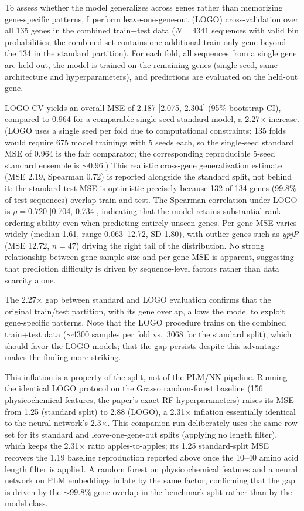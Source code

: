 \documentclass[12pt]{article}
\begin{document}
To assess whether the model generalizes across genes rather than memorizing gene-specific patterns, I perform leave-one-gene-out (LOGO) cross-validation over all 135 genes in the combined train+test data ($N = 4341$ sequences with valid bin probabilities; the combined set contains one additional train-only gene beyond the 134 in the standard partition).
For each fold, all sequences from a single gene are held out, the model is trained on the remaining genes (single seed, same architecture and hyperparameters), and predictions are evaluated on the held-out gene.

LOGO CV yields an overall MSE of 2.187 [2.075, 2.304] (95\% bootstrap CI), compared to 0.964 for a comparable single-seed standard model, a 2.27$\times$ increase.
(LOGO uses a single seed per fold due to computational constraints: 135 folds would require 675 model trainings with 5 seeds each, so the single-seed standard MSE of 0.964 is the fair comparator; the corresponding reproducible 5-seed standard ensemble is ${\sim}0.96$.)
This realistic cross-gene generalization estimate (MSE 2.19, Spearman 0.72) is reported alongside the standard split, not behind it: the standard test MSE is optimistic precisely because 132 of 134 genes (99.8\% of test sequences) overlap train and test.
The Spearman correlation under LOGO is $\rho = 0.720$ [0.704, 0.734], indicating that the model retains substantial rank-ordering ability even when predicting entirely unseen genes.
Per-gene MSE varies widely (median 1.61, range 0.063--12.72, SD 1.80), with outlier genes such as \textit{ypjP} (MSE 12.72, $n = 47$) driving the right tail of the distribution.
No strong relationship between gene sample size and per-gene MSE is apparent, suggesting that prediction difficulty is driven by sequence-level factors rather than data scarcity alone.

The 2.27$\times$ gap between standard and LOGO evaluation confirms that the original train/test partition, with its gene overlap, allows the model to exploit gene-specific patterns.
Note that the LOGO procedure trains on the combined train+test data (${\sim}$4300 samples per fold vs.\ 3068 for the standard split), which should favor the LOGO models; that the gap persists despite this advantage makes the finding more striking.

This inflation is a property of the split, not of the PLM/NN pipeline. Running the identical LOGO protocol on the Grasso random-forest baseline (156 physicochemical features, the paper's exact RF hyperparameters) raises its MSE from 1.25 (standard split) to 2.88 (LOGO), a 2.31$\times$ inflation essentially identical to the neural network's 2.3$\times$. This companion run deliberately uses the same row set for its standard and leave-one-gene-out splits (applying no length filter), which keeps the 2.31$\times$ ratio apples-to-apples; its 1.25 standard-split MSE recovers the 1.19 baseline reproduction reported above once the 10--40 amino acid length filter is applied. A random forest on physicochemical features and a neural network on PLM embeddings inflate by the same factor, confirming that the gap is driven by the ${\sim}99.8\%$ gene overlap in the benchmark split rather than by the model class.
\end{document}
